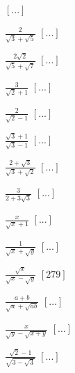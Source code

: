 \begin{esercizio}
\begin{multicols}{4}
\begin{enumeratea}
  \hfill $\left[...\right]$
 \item $\frac 2{\sqrt 3+\sqrt 5}$
  \hfill $\left[...\right]$
 \item $\frac{2\sqrt 2}{\sqrt 5+\sqrt 7}$
  \hfill $\left[...\right]$
 \item $\frac 3{\sqrt 2+1}$
  \hfill $\left[...\right]$
 \item $\frac 2{\sqrt 2-1}$
  \hfill $\left[...\right]$
 \item $\frac{\sqrt 3+1}{\sqrt 3-1}$
  \hfill $\left[...\right]$
 \item $\frac{2+\sqrt 3}{\sqrt 3+\sqrt 2}$
  \hfill $\left[...\right]$
 \item $\frac 3{2+3\sqrt 3}$
  \hfill $\left[...\right]$
 \item $\frac x{\sqrt x+1}$
  \hfill $\left[...\right]$
 \item $\frac 1{\sqrt x+\sqrt y}$
  \hfill $\left[...\right]$
 \item $\frac{\sqrt x}{\sqrt x-\sqrt y}$
  \hfill $\left[279\right]$
 \item $\frac{a+b}{\sqrt a+\sqrt{ab}}$
  \hfill $\left[...\right]$
 \item $\frac x{\sqrt y-\sqrt{x+y}}$
  \hfill $\left[...\right]$
 \item $\frac{\sqrt 2-1}{\sqrt{3-\sqrt 3}}$
  \hfill $\left[...\right]$
 \end{enumeratea}
 \end{multicols}
\end{esercizio}


